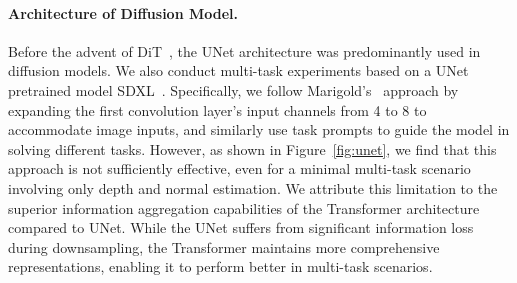 \paragraph{Architecture of Diffusion Model.}
Before the advent of DiT~\cite{peebles2023scalable}, the UNet architecture was predominantly used in diffusion models. We also conduct multi-task experiments based on a UNet pretrained model SDXL~\cite{podell2023sdxl}. Specifically, we follow Marigold's~\cite{ke2024repurposing} approach by expanding the first convolution layer's input channels from 4 to 8 to accommodate image inputs, and similarly use task prompts to guide the model in solving different tasks. However, as shown in Figure~\ref{fig:unet}, we find that this approach is not sufficiently effective, even for a minimal multi-task scenario involving only depth and normal estimation. 
We attribute this limitation to the superior information aggregation capabilities of the Transformer architecture compared to UNet. While the UNet suffers from significant information loss during downsampling, the Transformer maintains more comprehensive representations, enabling it to perform better in multi-task scenarios.
